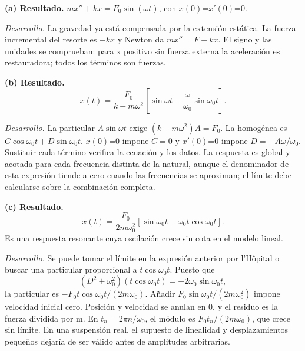 \noindent\textbf{(a) Resultado.} \(mx''+kx=F_0\sin(\omega t)\), con \(x(0)\)=\(x'(0)\)=0.

\noindent\textit{Desarrollo.} La gravedad ya está compensada por la extensión estática. La fuerza incremental del resorte es \(-kx\) y Newton da \(mx''=F-kx\). El signo y las unidades se comprueban: para x positivo sin fuerza externa la aceleración es restauradora; todos los términos son fuerzas.

\medskip

\noindent\textbf{(b) Resultado.} \[x(t)=\frac{F_0}{k-m\omega^2}\left[\sin\omega t-\frac{\omega}{\omega_0}\sin\omega_0t\right].\]

\noindent\textit{Desarrollo.} La particular \(A\sin\omega t\) exige \((k-m\omega^2)A=F_0\). La homogénea es \(C\cos\omega_0t+D\sin\omega_0t\). \(x(0)\)=0 impone \(C=0\) y \(x'(0)\)=0 impone \(D=-A\omega/\omega_0\). Sustituir cada término verifica la ecuación y los datos. La respuesta es global y acotada para cada frecuencia distinta de la natural, aunque el denominador de esta expresión tiende a cero cuando las frecuencias se aproximan; el límite debe calcularse sobre la combinación completa.

\medskip

\noindent\textbf{(c) Resultado.} \[x(t)=\frac{F_0}{2m\omega_0^2}[\sin\omega_0t-\omega_0t\cos\omega_0t].\]
Es una respuesta resonante cuya oscilación crece sin cota en el modelo lineal.

\noindent\textit{Desarrollo.} Se puede tomar el límite en la expresión anterior por l'Hôpital o buscar una particular proporcional a \(t\cos\omega_0t\). Puesto que
\[(D^2+\omega_0^2)(t\cos\omega_0t)=-2\omega_0\sin\omega_0t,\]
la particular es \(-F_0t\cos\omega_0t/(2m\omega_0)\). Añadir \(F_0\sin\omega_0t/(2m\omega_0^2)\) impone velocidad inicial cero. Posición y velocidad se anulan en 0, y el residuo es la fuerza dividida por m. En \(t_n=2\pi n/\omega_0\), el módulo es \(F_0t_n/(2m\omega_0)\), que crece sin límite. En una suspensión real, el supuesto de linealidad y desplazamientos pequeños dejaría de ser válido antes de amplitudes arbitrarias.
